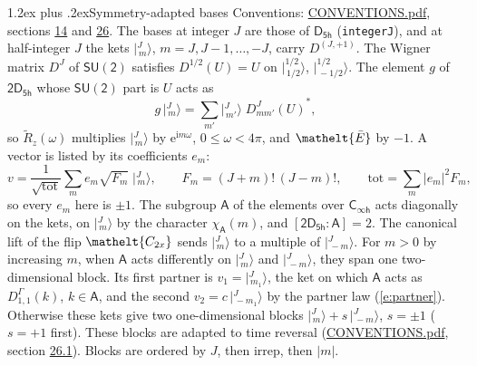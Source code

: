\documentclass[10pt,a4paper]{article}
\makeatletter
\renewcommand\section{\@startsection{section}{1}{\z@}{-3ex plus -1ex minus -.2ex}%
  {1.2ex plus .2ex}{\normalfont\large\sffamily\bfseries\color{parttitle}}}
\numberwithin{equation}{section}
\newcommand{\eltfont}[1]{{\let\sigma\eltsigma\mathelt{#1}}}
\newcommand{\grp}[1]{\mathsf{#1}}
\newcommand{\elt}[1]{\eltfont{#1}}
\newcommand{\grpindex}[2]{[#1 : #2]}
\newcommand{\iunit}{\mathrm{i}}
\newcommand{\expe}{\mathrm{e}}
\newcommand{\irrJp}[2]{D^{(#1,#2)}}
\newcommand{\repD}[1]{D^{#1}}
\newcommand{\wignerD}[1]{D^{#1}}
\newcommand{\chiA}{\chi_{\grp{A}}}
\newcommand{\conj}[1]{{#1}^{*}}
\newcommand{\jm}[2]{\bigl\lvert{}^{#1}_{\,#2}\bigr\rangle}
\newcommand{\barred}[1]{\bar{#1}}
\newcommand{\lift}[1]{\tilde{#1}}
\makeatother
\begin{document}
\section{Symmetry-adapted bases}\label{s:bases}
Conventions: \href{../../CONVENTIONS.pdf}{CONVENTIONS.pdf}, sections \href{../../../rotation/CONVENTIONS.pdf\#conv.14}{14} and \href{../../CONVENTIONS.pdf\#conv.26}{26}.
\leavevmode\label{n:index.m}\label{n:vector.ket}The bases at integer $J$ are those of \href{../../../rotation/data/pdf/D5h.pdf}{$\grp{D_{5h}}$} (\texttt{integerJ}), and at half-integer $J$ the kets $\jm{J}{m}$, $m = J, J-1, \dots, -J$, carry $\irrJp{J}{+1}$. \label{n:matrix.wigner}The Wigner matrix $\wignerD{J}$ of $\grp{SU(2)}$ satisfies $\wignerD{1/2}(U) = U$ on $\jm{1/2}{1/2}$, $\jm{1/2}{-1/2}$. The element $g$ of $\grp{2D_{5h}}$ whose $\grp{SU(2)}$ part is $U$ acts as
\begin{equation}\label{e:action}g\,\jm{J}{m} = \sum_{m'} \jm{J}{m'}\; \conj{\wignerD{J}_{m m'}(U)},\end{equation}
so $\lift{R}_{z}(\omega)$ multiplies $\jm{J}{m}$ by $\expe^{\iunit m\omega}$, $0 \le \omega < 4\pi$, and $\elt{\barred{E}}$ by $-1$. \label{n:index.ketcoefficient}\label{n:vector.basis.symmetry}\label{n:index.ketweight}\label{n:index.total}A vector is listed by its coefficients $e_m$:
\begin{equation}\label{e:ket}v = \frac{1}{\sqrt{\mathrm{tot}}}\sum_m e_m\sqrt{F_m}\;\jm{J}{m},\qquad F_m = (J+m)!\,(J-m)!,\qquad \mathrm{tot} = \sum_m |e_m|^2F_m,\end{equation}
so every $e_m$ here is $\pm 1$.
\leavevmode\label{n:group.A}\label{n:function.character.abelian}The subgroup $\grp{A}$ of the elements over $\grp{C_{\infty h}}$ acts diagonally on the kets, on $\jm{J}{m}$ by the character $\chiA(m)$, and $\grpindex{\grp{2D_{5h}}}{\grp{A}} = 2$. The canonical lift of the flip $\elt{C_{2x}}$ sends $\jm{J}{m}$ to a multiple of $\jm{J}{-m}$. For $m > 0$ by increasing $m$, when $\grp{A}$ acts differently on $\jm{J}{m}$ and $\jm{J}{-m}$, they span one two-dimensional block. \label{n:index.partner.sign}Its first partner is $v_1 = \jm{J}{m_1}$, the ket on which $\grp{A}$ acts as $\repD{\Gamma}_{1,1}(k)$, $k \in \grp{A}$, and the second $v_2 = c\,\jm{J}{-m_1}$ by the partner law (\ref{e:partner}). \label{n:index.pair.sign}Otherwise these kets give two one-dimensional blocks $\jm{J}{m} + s\,\jm{J}{-m}$, $s = \pm 1$ ($s = +1$ first). These blocks are adapted to time reversal (\href{../../CONVENTIONS.pdf}{CONVENTIONS.pdf}, section \href{../../CONVENTIONS.pdf\#conv.26.1}{26.1}). Blocks are ordered by $J$, then irrep, then $|m|$.
\end{document}
